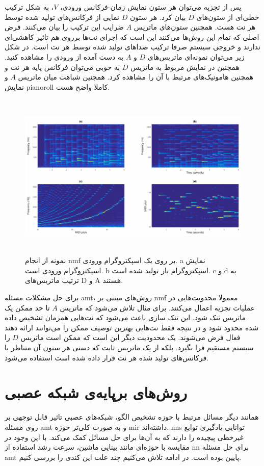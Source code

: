 پس از تجزیه می‌توان هر ستون نمایش زمان-فرکانس ورودی، $V$، به شکل ترکیب خطی‌ای از
ستون‌های $D$ بیان کرد. هر ستون $D$ نمایی از فرکانس‌های تولید شده توسط هر نت هست.
همچنین ستون‌های ماتریس $A$ ضرایب این ترکیب را بیان می‌کنند. فرض اصلی که تمام این
روش‌ها می‌کنند این است که اجرای نت‌ها برروی هم تاثیر کاهشی‌ای ندارند و خروجی
سیستم صرفا ترکیب صداهای تولید شده توسط هر نت است. در شکل زیر می‌توان نمونه‌ای
ماتریس‌های $D$ و $A$ به دست آمده از ورودی را مشاهده کنید. همچنین در نمایش مربوط
به ماتریس $D$ به خوبی می‌توان فرکانس پایه هر نت و همچنین هامونیک‌های مرتبط با آن
را مشاهده کرد. همچنین شباهت میان ماتریس $A$ و نمایش \gls{pianoroll} کاملا واضح
هست.
\begin{figure}
    \centering
    \includegraphics[height=8cm]{./statics/nmf_visualized.png}
    \caption{نمونه از انجام \gls{nmf} بر روی یک اسپکتروگرام ورودی. a نمایش
اسپکتروگرام ورودی است. b اسپکتروگرام باز تولید شده است. c و d به ترتیب
ماتریس‌های D و A هستند.}
\end{figure}

برای حل مشکلات مسئله \gls{amt}، روش‌های مبتنی بر \gls{nmf} معمولا محدویت‌هایی در
عملیات تجزیه اعمال می‌کنند. برای مثال تلاش می‌شود که ماتریس $A$ تا حد ممکن یک
ماتریس تنک شود. این تنک سازی باعث می‌شود که نت‌هایی همزمان تشخیص داده شده محدود
شود و در نتیجه فقط نت‌هایی بهترین توصیف ممکن را می‌توانند ارائه دهند فعال فرض
می‌شوند. یک محدودیت دیگر این است که ممکن است ماتریس $D$ را سیستم مستقیم فرا
نگیرد. بلکه از یک ماتریس ثابت که دستی هر ستون آن متناظر با فرکانس‌های تولید شده
هر نت قرار داده شده است استفاده می‌شود.

\section{روش‌های برپایه‌ی شبکه‌ عصبی}
همانند دیگر مسائل مرتبط با حوزه تشخیص الگو، شبکه‌های عصبی تاثیر قابل توجهی بر
روی مسئله \gls{amt} و به صورت کلی‌تر حوزه \gls{mir} داشته‌اند. \glspl{nn}
توانایی یادگیری توابع غیرخطی پیچیده‌ را دارند که به آن‌ها برای حل مسائل کمک
می‌کند. با این وجود در مقایسه با حوزه‌ای مانند بینایی ماشین، سرعت رشد استفاده از
\gls{nn} برای حل مسئله \gls{amt} پایین بوده است. در ادامه تلاش می‌کنیم چند علت
این کندی را بررسی کنیم.

